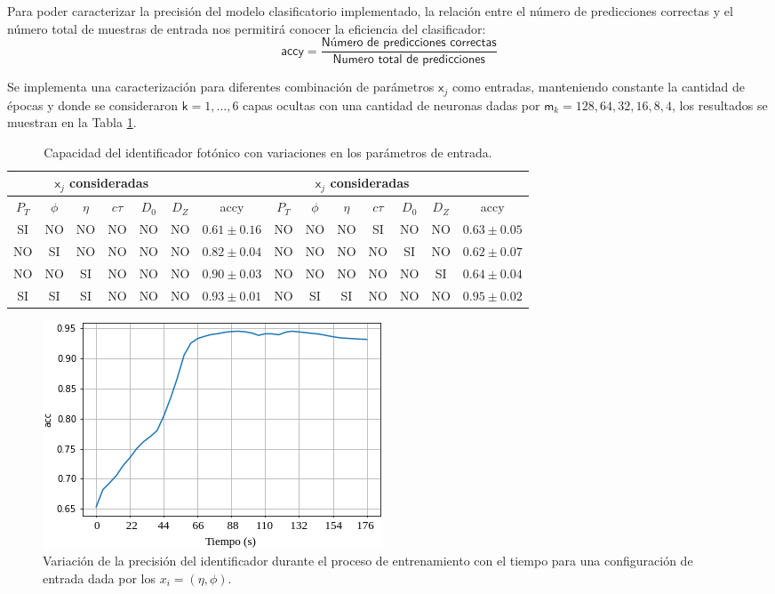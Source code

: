 Para poder caracterizar la precisión del modelo clasificatorio implementado, la relación entre el número de predicciones correctas y el número total de muestras de entrada nos permitirá conocer la eficiencia del clasificador:
\begin{equation}\label{acc}
\textsf{accy} =  \dfrac{\textsf{Número de predicciones correctas}}{\textsf{Numero total de predicciones}}
\end{equation}

Se implementa una caracterización para diferentes combinación de parámetros $\textsf{x}_{j}$ como entradas, manteniendo constante la cantidad de épocas y donde se consideraron $\textsf{k}=1,\ldots,6$ capas ocultas con una cantidad de neuronas dadas por $\textsf{m}_k = 128, 64, 32, 16, 8, 4$, los resultados se muestran en la Tabla \ref{ajuste1}.

\begin{table}[!h]
\footnotesize
\centering
\begin{tabular}{|cccccc|c||cccccc|c|}
\toprule
\multicolumn{6}{|c|}{$\textsf{x}_j$ consideradas} &  &
\multicolumn{6}{|c|}{$\textsf{x}_j$ consideradas} &  \\
\midrule
$P_T$ & $\phi$ & $\eta$ & $c\tau$ & $D_0$ & $D_Z$  & \textsf{accy} &
$P_T$ & $\phi$ & $\eta$ & $c\tau$ & $D_0$ & $D_Z$  & \textsf{accy} \\
\midrule
SI & NO & NO & NO & NO & NO & $0.61 \pm 0.16$ & 
NO & NO & NO & SI & NO & NO & $0.63 \pm 0.05$\\
NO & SI & NO & NO & NO & NO & $0.82 \pm 0.04$ & 
NO & NO & NO & NO & SI & NO & $0.62 \pm 0.07$\\  
NO & NO & SI & NO & NO & NO & $0.90 \pm 0.03$ & 
NO & NO & NO & NO & NO & SI & $0.64 \pm 0.04$\\
\bottomrule
SI & SI & SI & NO & NO & NO & $0.93 \pm 0.01$ &
NO & SI & SI & NO & NO & NO & $0.95 \pm 0.02$\\
\bottomrule 
\end{tabular}%
\caption{Capacidad del identificador fotónico con variaciones en los parámetros de entrada.}
\label{ajuste1}
\end{table}

\begin{figure}[!h]
\centering
\includegraphics[width=.5\textwidth]{Cap4/imagenes/acc.png}
\caption{Variación de la precisión del identificador durante el proceso de entrenamiento con el tiempo para una configuración de entrada dada por los $x_i = (\eta, \phi)$.}
\label{identificador0}
\end{figure}

